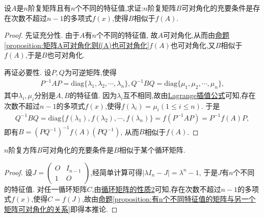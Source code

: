 \documentclass[../../main.tex]{subfiles}
\begin{document}
\begin{proposition}\label{proposition:有n个不同特征值的矩阵与另一个矩阵可对角化的关系}
设$A$是$n$阶复矩阵且有$n$个不同的特征值,求证:$n$阶复矩阵$B$可对角化的充要条件是存在次数不超过$n - 1$的多项式$f(x)$,使得$B$相似于$f(A)$.
\end{proposition}
\begin{proof}
先证充分性. 由于$A$有$n$个不同的特征值, 故$A$可对角化,从而由\hyperref[proposition:矩阵A可对角化则f(A)也可对角化]{命题\ref{proposition:矩阵A可对角化则f(A)也可对角化}}$f(A)$也可对角化,又$B$相似于$f(A)$,于是$B$也可对角化. 

再证必要性. 设$P,Q$为可逆矩阵,使得
\begin{align*}
P^{-1}AP=\mathrm{diag}\{\lambda_1,\lambda_2,\cdots,\lambda_n\}, Q^{-1}BQ=\mathrm{diag}\{\mu_1,\mu_2,\cdots,\mu_n\},
\end{align*}
其中$\lambda_i,\mu_i$分别是$A,B$的特征值. 因为$\lambda_i$互不相同,故由\hyperref[theorem:Lagrange插值公式]{Lagrange插值公式}可知,存在次数不超过$n - 1$的多项式$f(x)$,使得$f(\lambda_i)=\mu_i(1\leqslant  i\leqslant  n)$. 于是
\begin{align*}
Q^{-1}BQ=\mathrm{diag}\{f(\lambda_1),f(\lambda_2),\cdots,f(\lambda_n)\}=f(P^{-1}AP)=P^{-1}f(A)P,
\end{align*}
即有$B=(PQ^{-1})^{-1}f(A)(PQ^{-1})$, 从而$B$相似于$f(A)$. 
\end{proof}

\begin{corollary}\label{corollary:}
$n$阶复方阵$B$可对角化的充要条件是$B$相似于某个循环矩阵.
\end{corollary}
\begin{proof}
设$J=\begin{pmatrix}O&I_{n - 1}\\1&O\end{pmatrix}$,经简单计算可得$|\lambda I_n - J|=\lambda^n - 1$, 于是$J$有$n$个不同的特征值. 对任一循环矩阵$C$,由\hyperref[proposition:循环矩阵的性质]{循环矩阵的性质2}可知,存在次数不超过$n - 1$的多项式$f(x)$,使得$C = f(J)$,故由\hyperref[proposition:有n个不同特征值的矩阵与另一个矩阵可对角化的关系]{命题\ref{proposition:有n个不同特征值的矩阵与另一个矩阵可对角化的关系}}即得本推论.
\end{proof}
\end{document}
